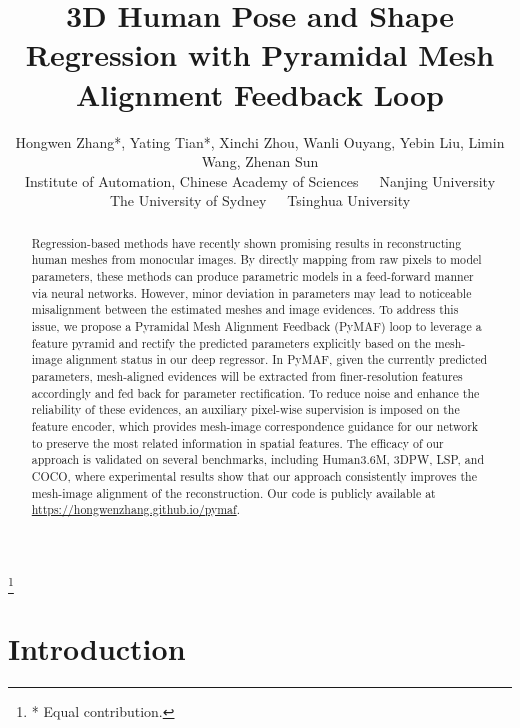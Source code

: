 \documentclass[10pt,twocolumn,letterpaper]{article}
\newcommand\blfootnote[1]{\begingroup
  \renewcommand\thefootnote{}\footnote{#1}\addtocounter{footnote}{-1}\endgroup
}
\begin{document}
\title{3D Human Pose and Shape Regression with Pyramidal Mesh Alignment Feedback Loop}

\author{Hongwen Zhang*, Yating Tian*, Xinchi Zhou, Wanli Ouyang, Yebin Liu, Limin Wang, Zhenan Sun\\
Institute of Automation, Chinese Academy of Sciences~~~Nanjing University\\
The University of Sydney~~~Tsinghua University
}


\maketitle
\ificcvfinal\thispagestyle{empty}\fi

\begin{abstract}
Regression-based methods have recently shown promising results in reconstructing human meshes from monocular images. By directly mapping from raw pixels to model parameters, these methods can produce parametric models in a feed-forward manner via neural networks. However, minor deviation in parameters may lead to noticeable misalignment between the estimated meshes and image evidences. To address this issue, we propose a Pyramidal Mesh Alignment Feedback (PyMAF) loop to leverage a feature pyramid and rectify the predicted parameters explicitly based on the mesh-image alignment status in our deep regressor. In PyMAF, given the currently predicted parameters, mesh-aligned evidences will be extracted from finer-resolution features accordingly and fed back for parameter rectification. To reduce noise and enhance the reliability of these evidences, an auxiliary pixel-wise supervision is imposed on the feature encoder, which provides mesh-image correspondence guidance for our network to preserve the most related information in spatial features. The efficacy of our approach is validated on several benchmarks, including Human3.6M, 3DPW, LSP, and COCO, where experimental results show that our approach consistently improves the mesh-image alignment of the reconstruction. Our code is publicly available at \href{https://hongwenzhang.github.io/pymaf}{https://hongwenzhang.github.io/pymaf}.
\end{abstract}

\blfootnote{* Equal contribution.}


\section{Introduction}\label{sec:introduction}
\end{document}
